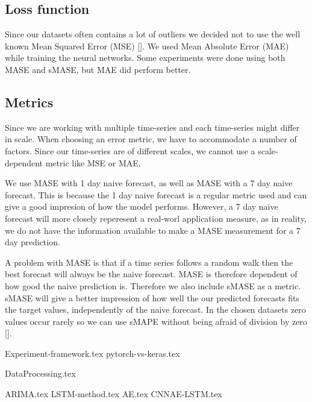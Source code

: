 \subsection*{Loss function}
Since our datasets often contains a lot of outliers we decided not to use the well known
Mean Squared Error (MSE) [].
We used Mean Absolute Error (MAE) while training the neural networks.
Some experiments were done using both MASE and sMASE, but MAE did perform better.

\subsection*{Metrics}
Since we are working with multiple time-series and each time-series might differ in scale.
When choosing an error metric, we have to accommodate a number of factors.
Since our time-series are of different scales, we cannot use a scale-dependent metric
like MSE or MAE.


We use MASE with 1 day naive forecast, as well as MASE with a 7 day
naive forecast. This is because the 1 day naive forecast is a regular metric used
and can give a good impresion of how the model performs.
However, a 7 day naive forecast will more closely reperesent a real-worl application measure,
as in reality, we do not have the information available to make a MASE measurement for a 7 day prediction.

A problem with MASE is that if a time series follows a random walk
then the best forecast will always be the naive forecast. MASE is therefore dependent of
how good the naive prediction is.
Therefore we also include sMASE as a metric.
sMASE will give a better impression of how well the our predicted forecasts fits the target values,
independently of the naive forecast.
In the chosen datasets zero values occur rarely so we can use sMAPE without
being afraid of division by zero [].


{Experiment-framework.tex}
{pytorch-vs-keras.tex}

{DataProcessing.tex}


{ARIMA.tex}
{LSTM-method.tex}
{AE.tex}
{CNNAE-LSTM.tex}
